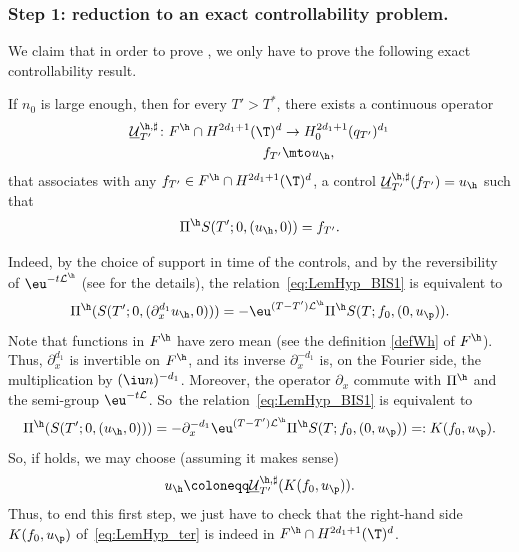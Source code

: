 \subsubsection*{Step 1: reduction to an exact controllability problem.} We claim that in order to prove , we only have to prove the following exact controllability result.

\begin{prop}
\label{LemHyp_BISPar_bis}
If $n_0$ is large enough, then for every ${T'}>T^{*}$, there exists a continuous operator
\begin{align*}
{\underline{\mathcal{U}}}_{T'}^{\h,\sharp} \colon
F^\h \cap H^{2d_1+1}(\T)^{d} &\to H_0^{2d_1+1}(q_{T'})^{d_1} \\
f_{T'} &\mto u_{\h},
\end{align*}
that associates with any $f_{T'} \in F^\h \cap H^{2d_1+1}(\T)^{d}$, a control $\underline{\mathcal{U}}_{T'}^{\h,\sharp} (f_{T'}) = u_{\h}$ such that
\begin{equation*}
\Pi^{\h} S({T'}; 0, (u_{\h}, 0)) = f_{T'}.
\end{equation*}
\end{prop}

Indeed, by the choice of support in time of the controls, and by the reversibility of $\eu^{-t\mathcal L^\h}$ (see  for the details), the relation~\eqref{eq:LemHyp_BIS1} is equivalent to
\begin{equation*}
\Pi^\h(S(T';0,(\partial_x^{d_1} u_\h,0))) = -\eu^{(T-T')\mathcal L^\h}\Pi^\h S(T;f_0,(0,u_\p)).
\end{equation*}
Note that functions in $F^\h$ have zero mean (see the definition \eqref{defWh} of $F^\h$). Thus, $\partial_x^{d_1}$ is invertible on $F^\h$, and its inverse $\partial_x^{-d_1}$ is, on the Fourier side, the multiplication by $(\iu n)^{-d_1}$. Moreover, the operator $\partial_x$ commute with $\Pi^\h$ and the semi-group $\eu^{-t\mathcal L}$. So~the relation~\eqref{eq:LemHyp_BIS1} is equivalent to
\begin{equation}\label{eq:LemHyp_ter}
\Pi^\h(S(T';0,(u_\h,0))) = - \partial_x^{-d_1}\eu^{(T-T')\mathcal L^\h}\Pi^\h S(T;f_0,(0,u_\p))=: K(f_0,u_\p).
\end{equation}
So, if  holds, we may choose (assuming it makes sense)
\[
u_\h \coloneqq \underline{\mathcal{U}}_{T'}^{\h,\sharp}(K(f_0,u_\p)).
\]
Thus, to end this first step, we just have to check that the right-hand side $K(f_0,u_\p)$ of~\eqref{eq:LemHyp_ter} is indeed in $F^\h\cap H^{2d_1+1}(\T)^d$.

